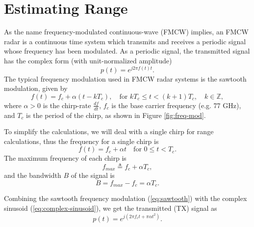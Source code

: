 \chapter{Estimating Range}
As the name frequency-modulated continuous-wave (FMCW) implies, an FMCW radar is
a continuous time system which transmits and receives a periodic signal whose 
frequency has been modulated. As a periodic signal, the transmitted signal has
the complex form (with unit-normalized amplitude)
\begin{equation}
	\label{eq:complex-sinusoid}
	p(t) = e^{j2\pi f(t)t}.
\end{equation}
The typical frequency modulation used in FMCW radar systems is the sawtooth
modulation, given by
\cite{stove1992linear, wang2008digital}
\begin{equation}
	\label{eq:sawtooth}
	f(t) = f_c + \alpha (t - kT_c), \quad\text{for } kT_c \leq t < (k+1)T_c, \quad
	k \in \mathbb{Z},
\end{equation}
where $\alpha > 0$ is the chirp-rate  $\frac{df}{dt}$, $f_c$ is the base
carrier frequency (e.g. 77 GHz), and $T_c$ is the period of the chirp, as shown
in Figure \ref{fig:freq-mod}.

To simplify the calculations, we will deal with a single chirp for range
calculations, thus the frequency for a single chirp is 
\begin{equation}
	f(t) = f_c + \alpha t \quad\text{for } 0\leq t < T_c.
\end{equation}
The maximum frequency of each chirp is 
\begin{equation}
	f_{max} \triangleq f_c + \alpha T_c,
\end{equation}
and the bandwidth $B$ of the signal is
\begin{equation}
	B = f_{max} - f_c = \alpha T_c.
\end{equation}

Combining the sawtooth frequency modulation (\ref{eq:sawtooth}) with the complex
sinusoid (\ref{eq:complex-sinusoid}), we get
the transmitted (TX) signal as
\begin{equation}
	p(t) = e^{j(2\pi f_c t+ \pi \alpha t^2)}.
\end{equation}

